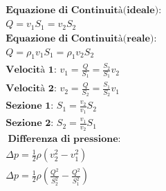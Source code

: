 \begin{gather*}
    \textbf{Equazione di Continuità(ideale): } \\  Q = v_1 S_1 = v_2 S_2 \\
    \textbf{Equazione di Continuità(reale): } \\ Q = \rho_1 v_1 S_1 = \rho_1 v_2 S_2 \\
    \textbf{Velocità 1: } v_1 = \frac{Q}{S_1} = \frac{S_2}{S_1} v_2 \\
    \textbf{Velocità 2: } v_2 = \frac{Q}{S_2} = \frac{S_1}{S_2} v_1 \\
    \textbf{Sezione 1: } S_1 = \frac{v_2}{v_1} S_2 \\
    \textbf{Sezione 2: } S_2 = \frac{v_1}{v_2} S_1 \\\
    \textbf{Differenza di pressione: } \\
    \Delta p = \frac{1}{2} \rho (v_2^2 - v_1^2) \\ 
    \Delta p = \frac{1}{2} \rho (\frac{Q^2}{S_2^2} - \frac{Q^2}{S_1^2})
\end{gather*}
